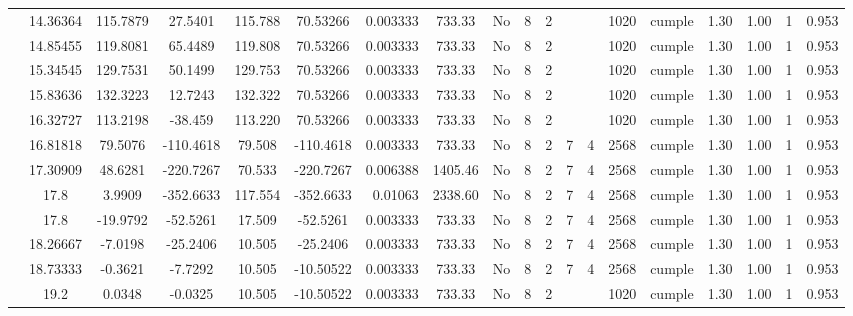 \begin{table}[H]
{\begin{tabular}{|c|c|c|c|c|c|r|c|c|c|c|c|c|c|c|c|c|c|c|}
\cline{2-19}        & 14.36364 & 115.7879 & 27.5401 & 115.788 & 70.53266 & 0.003333 & 733.33 & No  & 8   & 2   &     &     & 1020 & \cellcolor[rgb]{ .776,  .937,  .808}cumple & 1.30 & 1.00 & 1   & 0.953 \bigstrut\\
\cline{2-19}        & 14.85455 & 119.8081 & 65.4489 & 119.808 & 70.53266 & 0.003333 & 733.33 & No  & 8   & 2   &     &     & 1020 & \cellcolor[rgb]{ .776,  .937,  .808}cumple & 1.30 & 1.00 & 1   & 0.953 \bigstrut\\
\cline{2-19}        & 15.34545 & 129.7531 & 50.1499 & 129.753 & 70.53266 & 0.003333 & 733.33 & No  & 8   & 2   &     &     & 1020 & \cellcolor[rgb]{ .776,  .937,  .808}cumple & 1.30 & 1.00 & 1   & 0.953 \bigstrut\\
\cline{2-19}        & 15.83636 & 132.3223 & 12.7243 & 132.322 & 70.53266 & 0.003333 & 733.33 & No  & 8   & 2   &     &     & 1020 & \cellcolor[rgb]{ .776,  .937,  .808}cumple & 1.30 & 1.00 & 1   & 0.953 \bigstrut\\
\cline{2-19}        & 16.32727 & 113.2198 & -38.459 & 113.220 & 70.53266 & 0.003333 & 733.33 & No  & 8   & 2   &     &     & 1020 & \cellcolor[rgb]{ .776,  .937,  .808}cumple & 1.30 & 1.00 & 1   & 0.953 \bigstrut\\
\cline{2-19}        & 16.81818 & 79.5076 & -110.4618 & 79.508 & -110.4618 & 0.003333 & 733.33 & No  & 8   & 2   & 7   & 4   & 2568 & \cellcolor[rgb]{ .776,  .937,  .808}cumple & 1.30 & 1.00 & 1   & 0.953 \bigstrut\\
\cline{2-19}        & 17.30909 & 48.6281 & -220.7267 & 70.533 & -220.7267 & 0.006388 & 1405.46 & No  & 8   & 2   & 7   & 4   & 2568 & \cellcolor[rgb]{ .776,  .937,  .808}cumple & 1.30 & 1.00 & 1   & 0.953 \bigstrut\\
\cline{2-19}        & \cellcolor[rgb]{ .851,  .882,  .949}17.8 & 3.9909 & -352.6633 & 117.554 & -352.6633 & 0.01063 & 2338.60 & No  & 8   & 2   & 7   & 4   & 2568 & \cellcolor[rgb]{ .776,  .937,  .808}cumple & 1.30 & 1.00 & 1   & 0.953 \bigstrut\\
\cline{2-19}        & \cellcolor[rgb]{ .851,  .882,  .949}17.8 & -19.9792 & -52.5261 & 17.509 & -52.5261 & 0.003333 & 733.33 & No  & 8   & 2   & 7   & 4   & 2568 & \cellcolor[rgb]{ .776,  .937,  .808}cumple & 1.30 & 1.00 & 1   & 0.953 \bigstrut\\
\cline{2-19}        & 18.26667 & -7.0198 & -25.2406 & 10.505 & -25.2406 & 0.003333 & 733.33 & No  & 8   & 2   & 7   & 4   & 2568 & \cellcolor[rgb]{ .776,  .937,  .808}cumple & 1.30 & 1.00 & 1   & 0.953 \bigstrut\\
\cline{2-19}        & 18.73333 & -0.3621 & -7.7292 & 10.505 & -10.50522 & 0.003333 & 733.33 & No  & 8   & 2   & 7   & 4   & 2568 & \cellcolor[rgb]{ .776,  .937,  .808}cumple & 1.30 & 1.00 & 1   & 0.953 \bigstrut\\
\cline{2-19}        & 19.2 & 0.0348 & -0.0325 & 10.505 & -10.50522 & 0.003333 & 733.33 & No  & 8   & 2   &     &     & 1020 & \cellcolor[rgb]{ .776,  .937,  .808}cumple & 1.30 & 1.00 & 1   & 0.953 \bigstrut\\
    \hline
    \end{tabular}%
  
}
\end{table}
